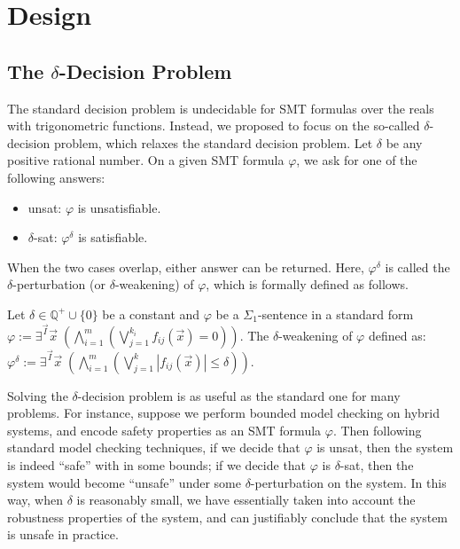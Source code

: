 \documentclass[envcountsect]{llncs}
\begin{document}
\section{Design}

\subsection{The $\delta$-Decision Problem}\label{lbl:deltas}

The standard decision problem is undecidable for SMT formulas
over the reals with trigonometric functions. Instead, we proposed to focus on the so-called $\delta$-decision problem, which relaxes the standard decision problem. Let $\delta$ be any positive rational number. On a given SMT formula $\varphi$, we ask for one of the
following answers:
\begin{itemize}
 \item {\sf unsat}: $\varphi$ is unsatisfiable.
 \item {\sf $\delta$-sat}: $\varphi^{\delta}$ is satisfiable.
\end{itemize}
When the two cases overlap, either answer can be returned. Here,
$\varphi^{\delta}$ is called the $\delta$-perturbation (or $\delta$-weakening)
of $\varphi$, which is formally defined as follows.
\begin{definition}
Let $\delta\in \mathbb{Q}^+\cup\{0\}$ be a constant and $\varphi$ be a
$\Sigma_1$-sentence in a standard form $\varphi:= \exists^{\vec I}\vec
x\;(\bigwedge_{i=1}^m (\bigvee_{j=1}^{k_i}
f_{ij}(\vec x)= 0))$. The $\delta$-weakening of $\varphi$ defined as:
$\varphi^{\delta}:= \exists^{\vec I} \vec x\;(\bigwedge_{i=1}^m(\bigvee_{j=1}^k
|f_{ij}(\vec x)|\leq \delta)).$
\end{definition}
Solving the $\delta$-decision problem is as useful as the standard one for many
problems. For instance, suppose we perform bounded
model checking on hybrid systems, and encode safety properties as an SMT
formula $\varphi$. Then following standard model checking techniques, if we
decide that $\varphi$ is {\sf unsat}, then the system is indeed ``safe'' with in
some bounds; if we decide that $\varphi$ is {\sf $\delta$-sat}, then the system
would become ``unsafe'' under some $\delta$-perturbation on the system. In this
way, when $\delta$ is reasonably small, we have essentially taken into account
the robustness properties of the system, and can justifiably conclude that the
system is unsafe in practice.
\end{document}
